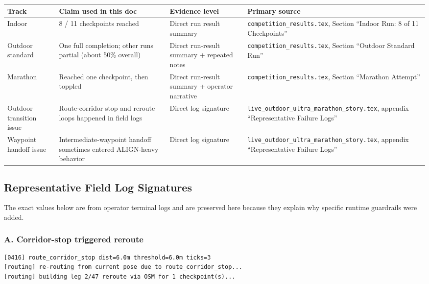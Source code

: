 \documentclass[11pt]{article}
\begin{document}
\begin{center}
\begin{tabular}{p{}p{}p{}p{}}
\toprule
\textbf{Track} & \textbf{Claim used in this doc} & \textbf{Evidence level} & \textbf{Primary source} \\
\midrule
Indoor & 8 / 11 checkpoints reached & Direct run result summary & \texttt{competition\_results.tex}, Section ``Indoor Run: 8 of 11 Checkpoints'' \\
Outdoor standard & One full completion; other runs partial (about 50\% overall) & Direct run-result summary + repeated notes & \texttt{competition\_results.tex}, Section ``Outdoor Standard Run'' \\
Marathon & Reached one checkpoint, then toppled & Direct run-result summary + operator narrative & \texttt{competition\_results.tex}, Section ``Marathon Attempt'' \\
Outdoor transition issue & Route-corridor stop and reroute loops happened in field logs & Direct log signature & \texttt{live\_outdoor\_ultra\_marathon\_story.tex}, appendix ``Representative Failure Logs'' \\
Waypoint handoff issue & Intermediate-waypoint handoff sometimes entered ALIGN-heavy behavior & Direct log signature & \texttt{live\_outdoor\_ultra\_marathon\_story.tex}, appendix ``Representative Failure Logs'' \\
\bottomrule
\end{tabular}
\end{center}

\subsection{Representative Field Log Signatures}

The exact values below are from operator terminal logs and are preserved here
because they explain why specific runtime guardrails were added.

\subsubsection*{A. Corridor-stop triggered reroute}
\begin{verbatim}
[0416] route_corridor_stop dist=6.0m threshold=6.0m ticks=3
[routing] re-routing from current pose due to route_corridor_stop...
[routing] building leg 2/47 reroute via OSM for 1 checkpoint(s)...
\end{verbatim}
\end{document}
